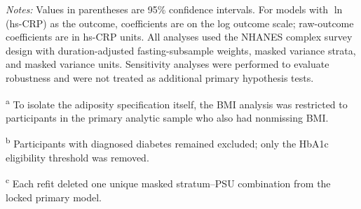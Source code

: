 \begin{landscape}
\begin{longtable}
\end{longtable}

\vspace{-0.5em}
\begin{minipage}{0.97\linewidth}
\footnotesize
\textit{Notes:} Values in parentheses are 95\% confidence intervals.
For models with $\ln$(hs-CRP) as the outcome, coefficients are on the log outcome scale;
raw-outcome coefficients are in hs-CRP units.
All analyses used the NHANES complex survey design with duration-adjusted fasting-subsample weights,
masked variance strata, and masked variance units.
Sensitivity analyses were performed to evaluate robustness and were not treated as additional primary hypothesis tests.

\textsuperscript{a} To isolate the adiposity specification itself, the BMI analysis was restricted
to participants in the primary analytic sample who also had nonmissing BMI.

\textsuperscript{b} Participants with diagnosed diabetes remained excluded; only the HbA1c
eligibility threshold was removed.

\textsuperscript{c} Each refit deleted one unique masked stratum--PSU combination from the locked primary model.
\end{minipage}

\end{landscape}
